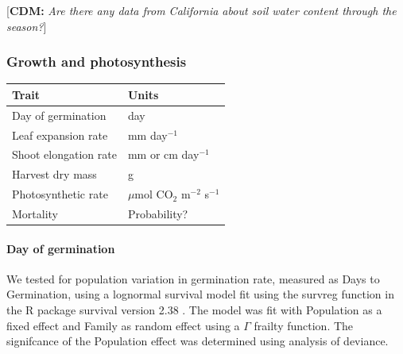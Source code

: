 \documentclass[11pt, oneside]{article}\usepackage[]{graphicx}\usepackage[]{color}
\newcommand{\pkg}[1]{{\fontseries{b}\selectfont #1}}
\newcommand{\cdm}[1]{{ \color{magenta} [{\bf{CDM:}} {\em#1}]}} %
\begin{document}
			\cdm{Are there any data from California about soil water content through the season?}


\subsubsection*{Growth and photosynthesis}

\begin{table}[ht]
   \centering
   \begin{tabular}{@{} ll @{}}
      \toprule
  Trait & Units \\
      \midrule
  Day of germination  & day \\
  Leaf expansion rate  &  mm day$^{-1}$  \\
  Shoot elongation rate  &  mm or cm day$^{-1}$  \\
  Harvest dry mass &  g  \\
  Photosynthetic rate &  $\mu$mol CO$_2$ m$^{-2}$ s$^{-1}$\\
  Mortality &  Probability?  \\
	    \bottomrule
   \end{tabular}
\end{table}

\paragraph{Day of germination} We tested for population variation in germination rate, measured as Days to Germination, using a lognormal survival model fit using the survreg function in the R package \pkg{survival} version 2.38 \citep{Therneau_2015}. The model was fit with Population as a fixed effect and Family as random effect using a $\Gamma$ frailty function. The signifcance of the Population effect was determined using analysis of deviance.
\end{document}
